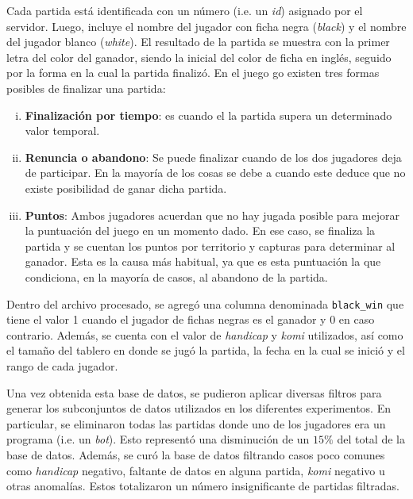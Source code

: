 \documentclass[11pt,twoside,spanish]{report} %
\begin{document}
Cada partida est\'a identificada con un n\'umero (i.e. un \textit{id}) asignado por el servidor.
Luego, incluye el nombre del jugador con ficha negra (\textit{black}) y el nombre del jugador blanco (\textit{white}).
El resultado de la partida se muestra con la primer letra del color del ganador, siendo la inicial del color de ficha en ingl\'es, seguido por la forma en la cual la partida finaliz\'o.
En el juego go existen tres formas posibles de finalizar una partida:
\begin{enumerate}[i)]
\item \textbf{Finalizaci\'on por tiempo}: es cuando el la partida supera un determinado valor temporal.

\item \textbf{Renuncia o abandono}: Se puede finalizar cuando de los dos jugadores deja de participar. En la mayor\'ia de los cosas se debe a cuando este  deduce que no existe posibilidad de ganar dicha partida.

\item \textbf{Puntos}: Ambos jugadores acuerdan que no hay jugada posible para mejorar la puntuaci\'on del juego en un momento dado.
En ese caso, se finaliza la partida y se cuentan los puntos por territorio y capturas para determinar al ganador.
Esta es la causa m\'as habitual, ya que es esta puntuaci\'on la que condiciona, en la mayor\'ia de casos, al abandono de la partida.
\end{enumerate}

Dentro del archivo procesado, se agreg\'o una columna denominada \texttt{black\_win} que tiene el valor 1 cuando el jugador de fichas negras es el ganador y 0 en caso contrario.
Adem\'as, se cuenta con el valor de \textit{handicap} y \textit{komi} utilizados, as\'i como el tama\~no del tablero en donde se jug\'o la partida, la fecha en la cual se inici\'o y el rango de cada jugador.

Una vez obtenida esta base de datos, se pudieron aplicar diversas filtros para generar los subconjuntos de datos utilizados en los diferentes experimentos.
En particular, se eliminaron todas las partidas donde uno de los jugadores era un programa (i.e. un \emph{bot}).
Esto represent\'o una disminuci\'on de un $15\%$ del total de la base de datos.
Adem\'as, se cur\'o la base de datos filtrando casos poco comunes como \textit{handicap} negativo, faltante de datos en alguna partida, \textit{komi} negativo u otras anomal\'ias.
Estos totalizaron un n\'umero insignificante de partidas filtradas.
\end{document}
